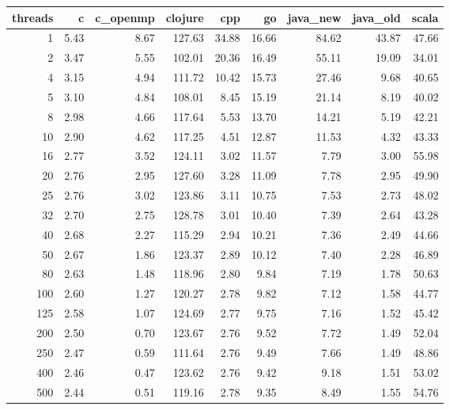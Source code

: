\begin{table}[ht]
\centering
\begin{tabular}{rrrrrrrrr}
  \hline
threads & c & c\_openmp & clojure & cpp & go & java\_new & java\_old & scala \\ 
  \hline
  1 & 5.43 & 8.67 & 127.63 & 34.88 & 16.66 & 84.62 & 43.87 & 47.66 \\ 
    2 & 3.47 & 5.55 & 102.01 & 20.36 & 16.49 & 55.11 & 19.09 & 34.01 \\ 
    4 & 3.15 & 4.94 & 111.72 & 10.42 & 15.73 & 27.46 & 9.68 & 40.65 \\ 
    5 & 3.10 & 4.84 & 108.01 & 8.45 & 15.19 & 21.14 & 8.19 & 40.02 \\ 
    8 & 2.98 & 4.66 & 117.64 & 5.53 & 13.70 & 14.21 & 5.19 & 42.21 \\ 
   10 & 2.90 & 4.62 & 117.25 & 4.51 & 12.87 & 11.53 & 4.32 & 43.33 \\ 
   16 & 2.77 & 3.52 & 124.11 & 3.02 & 11.57 & 7.79 & 3.00 & 55.98 \\ 
   20 & 2.76 & 2.95 & 127.60 & 3.28 & 11.09 & 7.78 & 2.95 & 49.90 \\ 
   25 & 2.76 & 3.02 & 123.86 & 3.11 & 10.75 & 7.53 & 2.73 & 48.02 \\ 
   32 & 2.70 & 2.75 & 128.78 & 3.01 & 10.40 & 7.39 & 2.64 & 43.28 \\ 
   40 & 2.68 & 2.27 & 115.29 & 2.94 & 10.21 & 7.36 & 2.49 & 44.66 \\ 
   50 & 2.67 & 1.86 & 123.37 & 2.89 & 10.12 & 7.40 & 2.28 & 46.89 \\ 
   80 & 2.63 & 1.48 & 118.96 & 2.80 & 9.84 & 7.19 & 1.78 & 50.63 \\ 
  100 & 2.60 & 1.27 & 120.27 & 2.78 & 9.82 & 7.12 & 1.58 & 44.77 \\ 
  125 & 2.58 & 1.07 & 124.69 & 2.77 & 9.75 & 7.16 & 1.52 & 45.42 \\ 
  200 & 2.50 & 0.70 & 123.67 & 2.76 & 9.52 & 7.72 & 1.49 & 52.04 \\ 
  250 & 2.47 & 0.59 & 111.64 & 2.76 & 9.49 & 7.66 & 1.49 & 48.86 \\ 
  400 & 2.46 & 0.47 & 123.62 & 2.76 & 9.42 & 9.18 & 1.51 & 53.02 \\ 
  500 & 2.44 & 0.51 & 119.16 & 2.78 & 9.35 & 8.49 & 1.55 & 54.76 \\ 
   \hline
\end{tabular}
\end{table}
